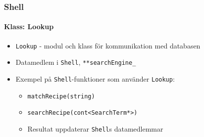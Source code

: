 \begin{frame}
  \frametitle{Shell}
  \framesubtitle{Klass: Lookup}
  \begin{itemize}
  \item \texttt{Lookup} - modul och klass för kommunikation med databasen
  \item Datamedlem i \texttt{Shell}, \texttt{**searchEngine\_}
  \item Exempel på \texttt{Shell}-funktioner som använder \texttt{Lookup}:
    \begin{itemize}
    \item \texttt{matchRecipe(string)}
    \item \texttt{searchRecipe(cont<SearchTerm*>)}
    \item Resultat uppdaterar \texttt{Shell}s datamedlemmar
    \end{itemize}
  \end{itemize}
\end{frame}

